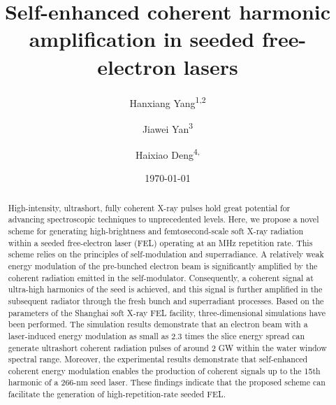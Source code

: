 \documentclass[%
 reprint,
 amsmath,amssymb,
 aps,
]{revtex4-2}
\begin{document}

\title{Self-enhanced coherent harmonic amplification in seeded free-electron lasers}%

\author{Hanxiang Yang\textsuperscript{1,}\textsuperscript{2}}
\author{Jiawei Yan\textsuperscript{3}}
\author{Haixiao Deng\textsuperscript{4,}}%
%

\date{\today}%

\begin{abstract}
High-intensity, ultrashort, fully coherent X-ray pulses hold great potential for advancing spectroscopic techniques to unprecedented levels. Here, we propose a novel scheme for generating high-brightness and femtosecond-scale soft X-ray radiation within a seeded free-electron laser (FEL) operating at an MHz repetition rate. This scheme relies on the principles of self-modulation and superradiance. A relatively weak energy modulation of the pre-bunched electron beam is significantly amplified by the coherent radiation emitted in the self-modulator. Consequently, a coherent signal at ultra-high harmonics of the seed is achieved, and this signal is further amplified in the subsequent radiator through the fresh bunch and superradiant processes. Based on the parameters of the Shanghai soft X-ray FEL facility, three-dimensional simulations have been performed. The simulation results demonstrate that an electron beam with a laser-induced energy modulation as small as 2.3 times the slice energy spread can generate ultrashort coherent radiation pulses of around 2 GW within the water window spectral range. Moreover, the experimental results demonstrate that self-enhanced coherent energy modulation enables the production of coherent signals up to the 15th harmonic of a 266-nm seed laser. These findings indicate that the proposed scheme can facilitate the generation
of high-repetition-rate seeded FEL.
\end{abstract}
\end{document}
